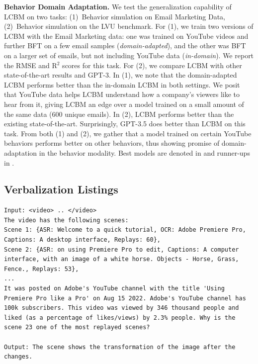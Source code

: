 \begin{table}[!htbp]
\begin{center}
\caption{\textbf{Behavior Domain Adaptation.} We test the generalization capability of LCBM on two tasks: (1)~Behavior simulation on \companyName Email Marketing Data, (2)~Behavior simulation on the LVU benchmark. For (1), we train two versions of LCBM with the \companyName Email Marketing data: one was trained on YouTube videos and further BFT on a few email samples (\textit{domain-adapted}), and the other was BFT on a larger set of emails, but not including YouTube data (\textit{in-domain})\protect\footnotemark[4]. We report the RMSE and R$^2$ scores for this task. For (2), we compare LCBM with other state-of-the-art results and GPT-3. In (1), we note that the domain-adapted LCBM performs better than the in-domain LCBM in both settings. We posit that YouTube data helps LCBM understand how a company's viewers like to hear from it, giving LCBM an edge over a model trained on a small amount of the same data (600 unique emails). In (2), LCBM performs better than the existing state-of-the-art. Surprisingly, GPT-3.5 does better than LCBM on this task. From both (1) and (2), we gather that a model trained on certain YouTube behaviors performs better on other behaviors, thus showing promise of domain-adaptation in the behavior modality. Best models are denoted in  and runner-ups in . \label{table:behavior-domain-adaptation}}
\end{center}
\end{table}







\subsection{Verbalization Listings}


\begin{lstlisting}[caption={Verbalization pattern of videos for the behavior understanding task:},frame=single,label={listing-behavior-understanding},basicstyle=\scriptsize]
Input: <video> .. </video>
The video has the following scenes:
Scene 1: {ASR: Welcome to a quick tutorial, OCR: Adobe Premiere Pro, Captions: A desktop interface, Replays: 60},
Scene 2: {ASR: on using Premiere Pro to edit, Captions: A computer interface, with an image of a white horse. Objects - Horse, Grass, Fence., Replays: 53},
...
It was posted on Adobe's YouTube channel with the title 'Using Premiere Pro like a Pro' on Aug 15 2022. Adobe's YouTube channel has 100k subscribers. This video was viewed by 346 thousand people and liked (as a percentage of likes/views) by 2.3% people. Why is the scene 23 one of the most replayed scenes?

Output: The scene shows the transformation of the image after the changes.
\end{lstlisting}



